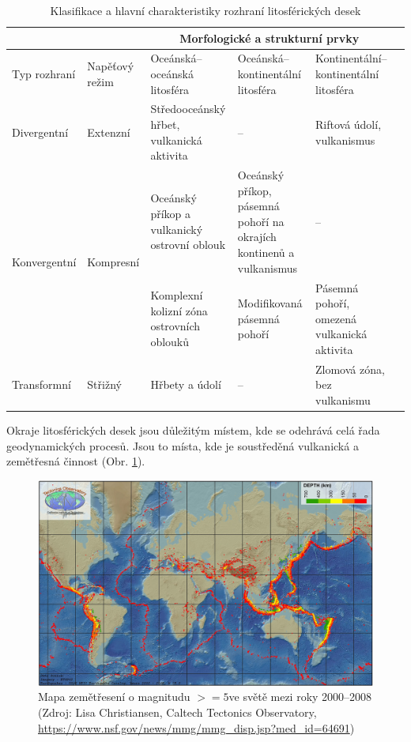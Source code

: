 \begin{table}[]
	\begin{tabularx}{1\textwidth}{XXXXXX}
		\toprule
		&          & \multicolumn{3}{c}{Morfologické a strukturní prvky}                                                                   \\ \midrule
		Typ rozhraní &
		Napěťový režim &
		Oceánská--oceánská litosféra &
		Oceánská--kontinentální litosféra &
		Kontinentální--kontinentální litosféra \\ \midrule
		Divergentní & Extenzní & Středooceánský hřbet, vulkanická aktivita & --                          & Riftová údolí, vulkanismus                  \\ \midrule
		\multirow{2}{*}{Konvergentní} &
		\multirow{2}{*}{Kompresní} &
		Oceánský příkop a vulkanický ostrovní oblouk &
		Oceánský příkop, pásemná pohoří na okrajích kontinenů a vulkanismus &
		-- \\
		&          & Komplexní kolizní zóna ostrovních oblouků & Modifikovaná pásemná pohoří & Pásemná pohoří, omezená vulkanická aktivita \\ \midrule
		Transformní & Střižný  & Hřbety a údolí                            & --                          & Zlomová zóna, bez vulkanismu               \\ \bottomrule
	\end{tabularx}
	\caption{Klasifikace a hlavní charakteristiky rozhraní litosférických desek}
	\label{tab:my-table}
\end{table}

Okraje litosférických desek jsou důležitým místem, kde se odehrává celá řada geodynamických procesů. Jsou to místa, kde je soustředěná vulkanická a zemětřesná činnost (Obr. \ref{fig:zemetresenidesky}). 

\begin{figure}[h]
	\centering
	\includegraphics[width=1\linewidth]{obrazky/tectonic/global_seismicity_h}
	\caption{Mapa zemětřesení o magnitudu $>=5$ve světě mezi roky 2000--2008 (Zdroj: Lisa Christiansen, Caltech Tectonics Observatory, \url{https://www.nsf.gov/news/mmg/mmg_disp.jsp?med_id=64691})}
	\label{fig:zemetresenidesky}
\end{figure}

